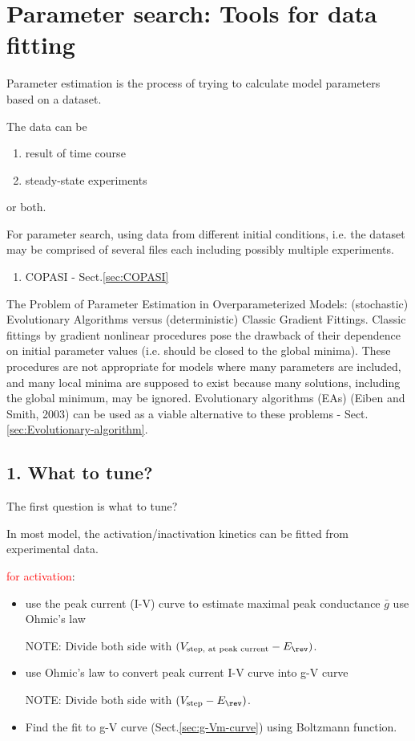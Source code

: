 \chapter{Parameter search: Tools for data fitting}
\label{sec:parameter-search}
\label{chap:parameter-search}


Parameter estimation is the process of trying to calculate model parameters
based on a dataset.

The data can be
\begin{enumerate}
  \item result of time course

  \item steady-state experiments
\end{enumerate}
or both.

For parameter search, using data from different initial conditions, i.e.
the dataset may be comprised of several files each including possibly
multiple experiments.
\begin{enumerate}
  \item COPASI - Sect.\ref{sec:COPASI}
\end{enumerate}

The Problem of Parameter Estimation in Overparameterized Models: (stochastic)
Evolutionary Algorithms versus (deterministic) Classic Gradient Fittings.
Classic fittings by gradient nonlinear procedures pose the drawback of their
dependence on initial parameter values (i.e. should be closed to the global
minima). These procedures are not appropriate for models where many parameters
are included, and many local minima are supposed to exist because many
solutions, including the global minimum, may be ignored. Evolutionary algorithms
(EAs) (Eiben and Smith, 2003) can be used as a viable alternative to these
problems - Sect.\ref{sec:Evolutionary-algorithm}.


\section{1. What to tune?}

The first question is what to tune?

In most model, the activation/inactivation kinetics can be fitted from
experimental data.

\textcolor{red}{for activation}:
\begin{itemize}
  \item use the peak current (I-V) curve to estimate maximal peak
  conductance $\bar{g}$ use Ohmic's law

NOTE: Divide both side with $(V_\text{step, at peak current} - E_{\rev})$.

  \item use Ohmic's law to convert peak current I-V curve into
  g-V curve

NOTE: Divide both side with $(V_\text{step} - E_{\rev})$.

  \item Find the fit to g-V curve (Sect.\ref{sec:g-Vm-curve}) using Boltzmann
  function.


\end{itemize}


